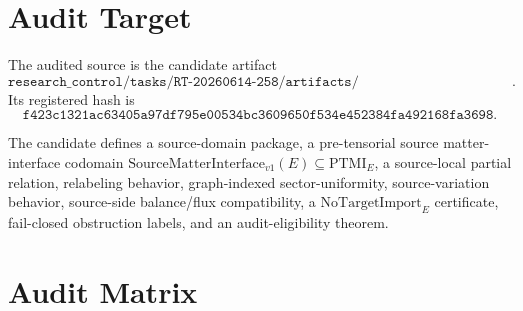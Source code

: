 \documentclass[11pt]{article}
\newcommand{\SMI}{\mathrm{SourceMatterInterface}_{v1}}
\newcommand{\PTMI}{\mathrm{PTMI}}
\newcommand{\NoTargetImport}{\mathrm{NoTargetImport}}
\begin{document}
\section{Audit Target}

The audited source is the candidate artifact
\[
  \texttt{research\_control/tasks/RT-20260614-258/artifacts/287\_...\_BRIDGE\_CANDIDATE\_V1.tex}.
\]
Its registered hash is
\[
  \texttt{f423c1321ac63405a97df795e00534bc3609650f534e452384fa492168fa3698}.
\]

The candidate defines a source-domain package, a pre-tensorial source
matter-interface codomain \(\SMI(E)\subseteq\PTMI_E\), a source-local partial
relation, relabeling behavior, graph-indexed sector-uniformity,
source-variation behavior, source-side balance/flux compatibility, a
\(\NoTargetImport_E\) certificate, fail-closed obstruction labels, and an
audit-eligibility theorem.

\section{Audit Matrix}
\end{document}
